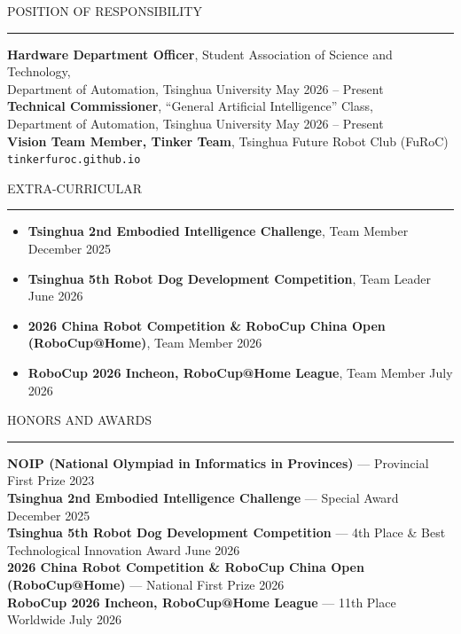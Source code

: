 \documentclass{resume} %
\renewenvironment{rSection}[1]{
\sectionskip
\textcolor{TsinghuaPurple}{\MakeUppercase{#1}}
\sectionlineskip
\hrule
\begin{list}{}{
\setlength{\leftmargin}{0em}
}
\item[]
}{
\end{list}
}
\begin{document}
\begin{rSection}{POSITION OF RESPONSIBILITY} \itemsep -3pt

{\textbf{Hardware Department Officer}, Student Association of Science and Technology, \\Department of Automation, Tsinghua University} \hfill May 2026 -- Present \\
{\textbf{Technical Commissioner}, ``General Artificial Intelligence'' Class, \\Department of Automation, Tsinghua University} \hfill May 2026 -- Present \\
{\textbf{Vision Team Member, Tinker Team}, Tsinghua Future Robot Club (FuRoC)} \hfill \texttt{tinkerfuroc.github.io} \\

\end{rSection}
  


\begin{rSection}{Extra-Curricular} \itemsep -2pt

\begin{itemize}

\item \textbf{Tsinghua 2nd Embodied Intelligence Challenge}, Team Member \hfill December 2025
\item \textbf{Tsinghua 5th Robot Dog Development Competition}, Team Leader \hfill June 2026
\item \textbf{2026 China Robot Competition \& RoboCup China Open (RoboCup@Home)}, Team Member \hfill 2026
\item \textbf{RoboCup 2026 Incheon, RoboCup@Home League}, Team Member \hfill July 2026

\end{itemize}

\end{rSection} 




\begin{rSection}{Honors and Awards} \itemsep -2pt

\textbf{NOIP (National Olympiad in Informatics in Provinces)} --- Provincial First Prize \hfill 2023 \\
\textbf{Tsinghua 2nd Embodied Intelligence Challenge} --- Special Award \hfill December 2025 \\
\textbf{Tsinghua 5th Robot Dog Development Competition} --- 4th Place \& Best Technological Innovation Award \hfill June 2026 \\
\textbf{2026 China Robot Competition \& RoboCup China Open (RoboCup@Home)} --- National First Prize \hfill 2026 \\
\textbf{RoboCup 2026 Incheon, RoboCup@Home League} --- 11th Place Worldwide \hfill July 2026 \\

\end{rSection}
\end{document}
